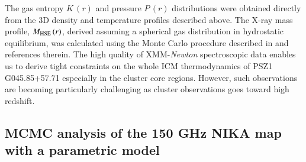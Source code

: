 \documentclass[traditabstract]{aa}
\begin{document}
The gas entropy $K\,(r)$ and pressure $P\,(r)$ distributions were obtained directly from the 3D density and temperature profiles described above. The X-ray mass profile, $M_{\rm HSE}\, (r)$,  derived assuming a spherical gas distribution in hydrostatic equilibrium, was calculated using the Monte Carlo procedure described in \citealt{dem10} and references therein. The high quality of XMM-{\it Newton} spectroscopic data enables us to derive tight constraints on the whole ICM thermodynamics of \mbox{PSZ1\,G045.85+57.71} especially in the cluster core regions. However, such observations are becoming particularly challenging as cluster observations goes toward high redshift.

\subsection{MCMC analysis of the 150 GHz NIKA map with a parametric model}\label{sec:MCMC_old_NIKA}
\end{document}
